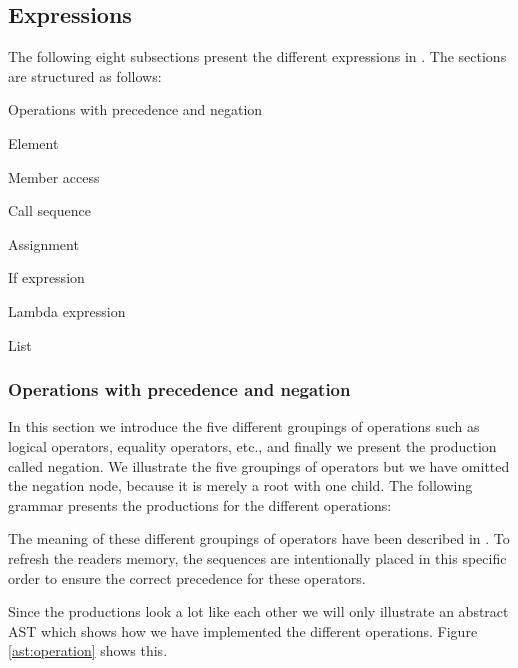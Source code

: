 \subsection{Expressions}
The following eight subsections present the different expressions in \productname{}. The sections are structured as follows:

\begin{dlist}
\item Operations with precedence and negation
\item Element
\item Member access
\item Call sequence
\item Assignment
\item If expression
\item Lambda expression
\item List
\end{dlist}

\subsubsection{Operations with precedence and negation}
In this section we introduce the five different groupings of operations such as logical operators, equality operators, etc., and finally we present the production called negation. We illustrate the five groupings of operators but we have omitted the negation node, because it is merely a root with one child. The following grammar presents the productions for the different operations:

\begin{ebnf}
\end{ebnf}

The meaning of these different groupings of operators have been described in . To refresh the readers memory, the sequences are intentionally placed in this specific order to ensure the correct precedence for these operators.

Since the productions look a lot like each other we will only illustrate an abstract AST which shows how we have implemented the different operations. Figure \ref{ast:operation} shows this.

